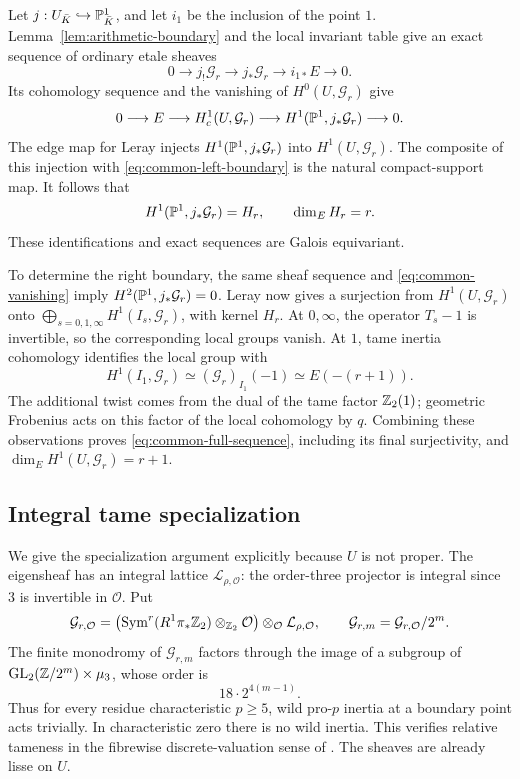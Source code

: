 Let \(j:U_{\bar K}\hookrightarrow\mathbb P^1_{\bar K}\), and let
\(i_1\) be the inclusion of the point \(1\). Lemma~\ref{lem:arithmetic-boundary}
and the local invariant table give an exact sequence of ordinary etale
sheaves
\[
 0\longrightarrow j_!\mathcal G_r\longrightarrow j_*\mathcal G_r
     \longrightarrow i_{1*}E\longrightarrow0.
\]
Its cohomology sequence and the vanishing of \(H^0(U,\mathcal G_r)\)
give
\begin{equation}\label{eq:common-left-boundary}
 0\longrightarrow E\longrightarrow H_c^1(U,\mathcal G_r)
   \longrightarrow H^1(\mathbb P^1,j_*\mathcal G_r)\longrightarrow0.
\end{equation}
The edge map for Leray injects
\(H^1(\mathbb P^1,j_*\mathcal G_r)\) into \(H^1(U,\mathcal G_r)\).
The composite of this injection with
\eqref{eq:common-left-boundary} is the natural compact-support map.
It follows that
\[
 H^1(\mathbb P^1,j_*\mathcal G_r)=H_r,
 \qquad \dim_EH_r=r.
\]
These identifications and exact sequences are Galois equivariant.

To determine the right boundary, the same sheaf sequence and
\eqref{eq:common-vanishing} imply
\(H^2(\mathbb P^1,j_*\mathcal G_r)=0\). Leray now gives a surjection from
\(H^1(U,\mathcal G_r)\) onto
\(\bigoplus_{s=0,1,\infty}H^1(I_s,\mathcal G_r)\), with kernel
\(H_r\). At \(0,\infty\), the operator \(T_s-1\) is invertible,
so the corresponding local groups vanish. At \(1\), tame inertia
cohomology identifies the local group with
\[
 H^1(I_1,\mathcal G_r)
   \simeq (\mathcal G_r)_{I_1}(-1)
   \simeq E(-(r+1)).
\]
The additional twist comes from the dual of the tame factor
\(\mathbb Z_2(1)\); geometric Frobenius acts on this factor of the local
cohomology by \(q\). Combining these observations proves
\eqref{eq:common-full-sequence}, including its final surjectivity, and
\(\dim_EH^1(U,\mathcal G_r)=r+1\).

\subsection{Integral tame specialization}

We give the specialization argument explicitly because \(U\) is not
proper. The eigensheaf has an integral lattice
\(\mathcal L_{\rho,\mathcal O}\): the order-three projector is
integral since \(3\) is invertible in \(\mathcal O\). Put
\[
 \mathcal G_{r,\mathcal O}
  =\bigl(\operatorname{Sym}^r(R^1\pi_*\mathbb Z_2)\otimes_{\mathbb Z_2}\mathcal O\bigr)
       \otimes_{\mathcal O}\mathcal L_{\rho,\mathcal O},
 \qquad \mathcal G_{r,m}=\mathcal G_{r,\mathcal O}/2^m.
\]
The finite monodromy of \(\mathcal G_{r,m}\) factors through the image
of a subgroup of
\(\operatorname{GL}_2(\mathbb Z/2^m)\times\mu_3\), whose order is
\[
 18\cdot2^{4(m-1)}.
\]
Thus for every residue characteristic \(p\ge5\), wild pro-\(p\)
inertia at a boundary point acts trivially. In characteristic zero there
is no wild inertia. This verifies relative tameness in the fibrewise
discrete-valuation sense of \cite[Expose~XIII, Definition~2.1.1]{SGA1}.
The sheaves are already lisse on \(U\).

